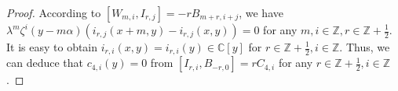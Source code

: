 \documentclass[12pt,reqno]{amsart}
\def\Z{\mathbb{Z}}
\def\C{\mathbb{C}}
\numberwithin{equation}{section}
\begin{document}
\begin{proof}
According to $[W_{m,i}, I_{r,j}]=-rB_{m+r,i+j}$, we have $\lambda^m\zeta^i(y-m\alpha)(i_{r,j}(x+m,y)-i_{r,j}(x,y))=0$
for any $m,i\in\mathbb{Z},r\in\Z+\frac{1}{2}$. It is easy to obtain $i_{r,i}(x,y)=i_{r,i}(y)\in\mathbb{C}[y]$ for $r\in\mathbb{Z}+\frac{1}{2},i\in\Z$. Thus, we can deduce that $c_{4,i}(y)=0$ from $[I_{r,i},B_{-r,0}]=rC_{4,i}$ for any $r\in\Z+\frac{1}{2},i\in\Z$.





\end{proof}
\end{document}
